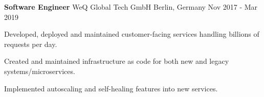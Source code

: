 \begin{cventries}
	\cventry
	{\textbf{Software Engineer}} %
	{WeQ Global Tech GmbH} %
	{Berlin, Germany} %
	{Nov 2017 - Mar 2019} %
	{
		\begin{cvitems} %
			\item {
			            Developed, deployed and maintained customer-facing services handling
			            billions of requests per day.
			      }
			\item {
			            Created and maintained infrastructure as code for both new and legacy
			            systems/microservices.
			      }
			\item {
			            Implemented autoscaling and self-healing features into new services.
			      }
		\end{cvitems}
	}


\end{cventries}
